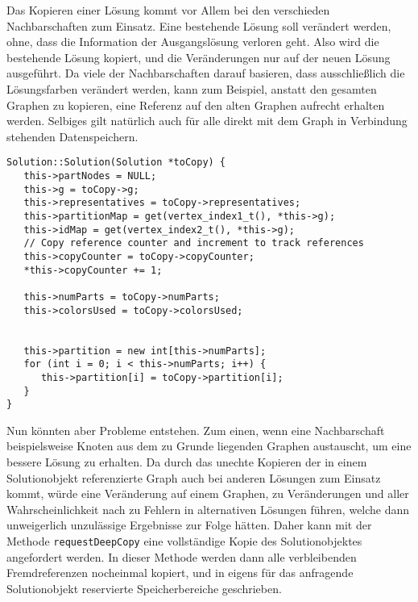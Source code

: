 Das Kopieren einer Lösung kommt vor Allem bei den verschieden Nachbarschaften zum Einsatz. Eine bestehende Lösung soll verändert werden, ohne, dass die Information der Ausgangslösung verloren geht. Also wird
die bestehende Lösung kopiert, und die Veränderungen nur auf der neuen Lösung ausgeführt. Da viele der Nachbarschaften darauf basieren, dass ausschließlich die Lösungsfarben verändert werden, kann zum Beispiel, 
anstatt den gesamten Graphen zu kopieren, eine Referenz auf den alten Graphen aufrecht erhalten werden. Selbiges gilt natürlich auch für alle direkt mit dem Graph in Verbindung stehenden Datenspeichern. 

\singlespacing
\begin{lstlisting}[caption={Der Kopierkonstruktor der Solutionklasse},label={lst:copy}]
Solution::Solution(Solution *toCopy) {
   this->partNodes = NULL;
   this->g = toCopy->g;
   this->representatives = toCopy->representatives;
   this->partitionMap = get(vertex_index1_t(), *this->g);
   this->idMap = get(vertex_index2_t(), *this->g); 
   // Copy reference counter and increment to track references
   this->copyCounter = toCopy->copyCounter;
   *this->copyCounter += 1;  
   
   this->numParts = toCopy->numParts;
   this->colorsUsed = toCopy->colorsUsed;

   
   this->partition = new int[this->numParts];
   for (int i = 0; i < this->numParts; i++) {
      this->partition[i] = toCopy->partition[i];
   }
}
\end{lstlisting}

Nun könnten aber Probleme entstehen. Zum einen, wenn eine Nachbarschaft beispielsweise Knoten aus dem zu Grunde liegenden Graphen austauscht, um eine bessere Lösung zu erhalten. Da durch das unechte Kopieren
der in einem Solutionobjekt referenzierte Graph auch bei anderen Lösungen zum Einsatz kommt, würde eine Veränderung auf einem Graphen, zu Veränderungen und aller Wahrscheinlichkeit nach zu Fehlern in alternativen
Lösungen führen, welche dann unweigerlich unzulässige Ergebnisse zur Folge hätten. Daher kann mit der Methode \texttt{requestDeepCopy} eine vollständige Kopie des Solutionobjektes angefordert werden. In dieser
Methode werden dann alle verbleibenden Fremdreferenzen nocheinmal kopiert, und in eigens für das anfragende Solutionobjekt reservierte Speicherbereiche geschrieben.

